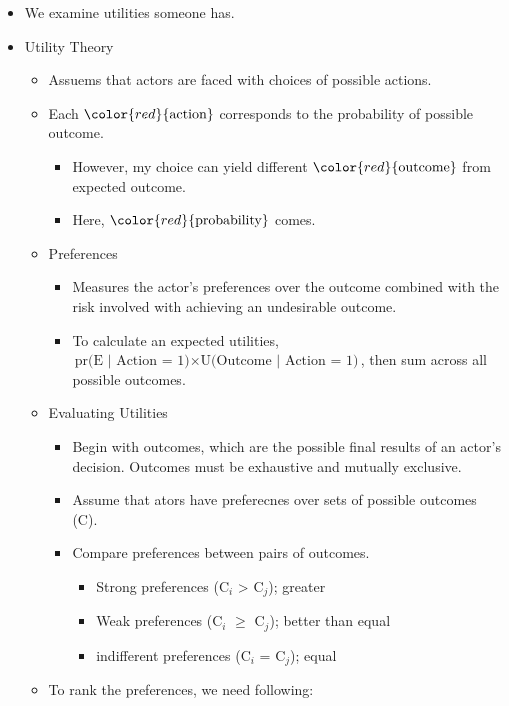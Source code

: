 \documentclass[]{book}
\providecommand{\tightlist}{%
  \setlength{\itemsep}{0pt}\setlength{\parskip}{0pt}}
\begin{document}
\begin{itemize}
\item
  We examine utilities someone has.
\item
  Utility Theory

  \begin{itemize}
  \item
    Assuems that actors are faced with choices of possible actions.
  \item
    Each \(\color{red}{\text{action}}\) corresponds to the probability of possible outcome.

    \begin{itemize}
    \tightlist
    \item
      However, my choice can yield different \(\color{red}{\text{outcome}}\) from expected outcome.
    \item
      Here, \(\color{red}{\text{probability}}\) comes.
    \end{itemize}
  \item
    Preferences

    \begin{itemize}
    \tightlist
    \item
      Measures the actor's preferences over the outcome combined with the risk involved with achieving an undesirable outcome.
    \item
      To calculate an expected utilities,
      \(\text{pr(E | Action = 1)} \times \text{U(Outcome | Action = 1)}\), then sum across all possible outcomes.
    \end{itemize}
  \item
    Evaluating Utilities

    \begin{itemize}
    \tightlist
    \item
      Begin with outcomes, which are the possible final results of an actor's decision. Outcomes must be exhaustive and mutually exclusive.
    \item
      Assume that ators have preferecnes over sets of possible outcomes (C).
    \item
      Compare preferences between pairs of outcomes.

      \begin{itemize}
      \tightlist
      \item
        Strong preferences (C\(_i\) \textgreater{} C\(_j\)); greater
      \item
        Weak preferences (C\(_i\) \(\geq\) C\(_j\)); better than equal
      \item
        indifferent preferences (C\(_i\) = C\(_j\)); equal
      \end{itemize}
    \end{itemize}
  \item
    To rank the preferences, we need following:


\end{itemize}
\end{itemize}
\end{document}
